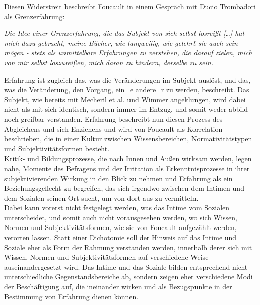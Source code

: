 Diesen Widerstreit beschreibt Foucault in einem Gespräch mit Ducio Trombadori als Grenzerfahrung:
\begin{myenv}
  \textit{\glqq Die Idee einer Grenzerfahrung, die das Subjekt von sich selbst
  losreißt […] hat mich dazu gebracht, meine Bücher, wie langweilig, wie
gelehrt sie auch sein mögen - stets als unmittelbare Erfahrungen zu verstehen,
die darauf zielen, mich von mir selbst loszureißen, mich daran zu hindern,
derselbe zu sein.\grqq\footnotemark {}} 
\end{myenv} 
Erfahrung ist zugleich das, was die Veränderungen im Subjekt
auslöst, und das, was die Veränderung, den Vorgang, ein\_e andere\_r zu werden,
beschreibt. Das Subjekt, wie bereits mit Mecheril et al. und Wimmer
angeklungen, wird dabei nicht als mit sich identisch, sondern immer im Entzug,
und somit weder abbild- noch greifbar verstanden. Erfahrung beschreibt nun
diesen Prozess des Abgleichens und sich Enziehens und wird von Foucault als
Korrelation beschrieben, die \glqq in einer Kultur zwischen Wissensbereichen,
Normativitätstypen und Subjektivitätsformen\grqq\footnotemark
{} besteht.\\

\noindent Kritik- und
Bildungsprozesse, die nach Innen und Außen wirksam werden, legen nahe, Momente
des Befragens und der Irritation als Erkenntnisprozesse in ihrer
subjektivierenden Wirkung in den Blick zu nehmen und Erfahrung als ein
Beziehungsgeflecht zu begreifen, das sich irgendwo zwischen dem Intimen und dem
Sozialen seinen Ort sucht, um von dort aus zu vermitteln.\\
Dabei kann vorerst
nicht festgelegt werden, was das Intime vom Sozialen unterscheidet, und somit
auch nicht vorausgesehen werden, wo sich Wissen, Normen und
Subjektivitätsformen, wie sie von Foucault aufgezählt werden, verorten lassen.
Statt einer Dichotomie soll der Hinweis auf das Intime und Soziale eher als
Form der Rahmung verstanden werden, innerhalb derer sich mit Wissen, Normen und
Subjektivitätsformen auf verschiedene Weise auseinandergesetzt wird. Das Intime
und das Soziale bilden entsprechend nicht unterschiedliche Gegenstandsbereiche
ab, sondern zeigen eher verschiedene Modi der Beschäftigung auf, die ineinander
wirken und als Bezugspunkte in der Bestimmung von Erfahrung dienen können.\\
 
